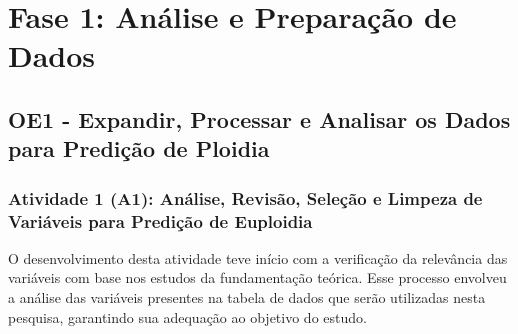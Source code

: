 \section{Fase 1: Análise e Preparação de Dados}
\subsection{OE1 - Expandir, Processar e Analisar os Dados para Predição de Ploidia}
\subsubsection{Atividade 1 (A1): Análise, Revisão, Seleção e Limpeza de Variáveis para Predição de Euploidia}
O desenvolvimento desta atividade teve início com a verificação da relevância das variáveis com base nos estudos da fundamentação teórica. Esse processo envolveu a análise das variáveis presentes na tabela de dados que serão utilizadas nesta pesquisa, garantindo sua adequação ao objetivo do estudo. 


